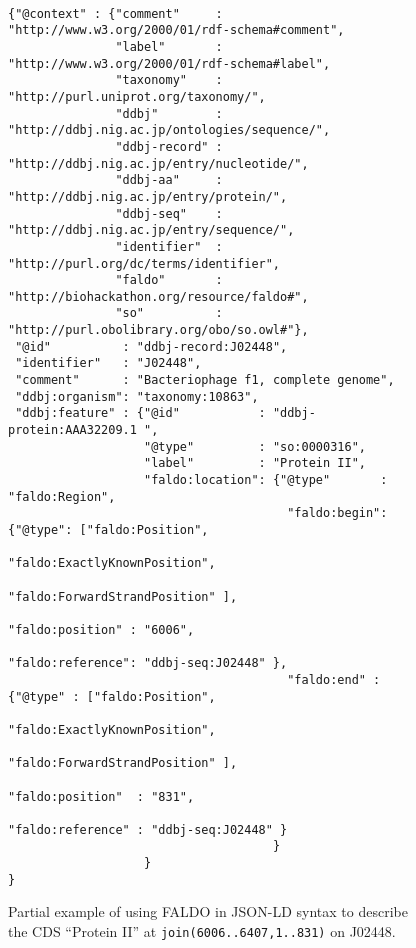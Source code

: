 \begin{figure}
\begin{shaded}
\small
\begin{verbatim}

{"@context" : {"comment"     : "http://www.w3.org/2000/01/rdf-schema#comment",
               "label"       : "http://www.w3.org/2000/01/rdf-schema#label",
               "taxonomy"    : "http://purl.uniprot.org/taxonomy/",
               "ddbj"        : "http://ddbj.nig.ac.jp/ontologies/sequence/",
               "ddbj-record" : "http://ddbj.nig.ac.jp/entry/nucleotide/",
               "ddbj-aa"     : "http://ddbj.nig.ac.jp/entry/protein/",
               "ddbj-seq"    : "http://ddbj.nig.ac.jp/entry/sequence/",
               "identifier"  : "http://purl.org/dc/terms/identifier",
               "faldo"       : "http://biohackathon.org/resource/faldo#",
               "so"          : "http://purl.obolibrary.org/obo/so.owl#"},
 "@id"          : "ddbj-record:J02448",
 "identifier"   : "J02448",
 "comment"      : "Bacteriophage f1, complete genome",
 "ddbj:organism": "taxonomy:10863",
 "ddbj:feature" : {"@id"           : "ddbj-protein:AAA32209.1 ",
                   "@type"         : "so:0000316",
                   "label"         : "Protein II",
                   "faldo:location": {"@type"       : "faldo:Region",
                                       "faldo:begin": {"@type": ["faldo:Position", 
                                                                 "faldo:ExactlyKnownPosition",
                                                                 "faldo:ForwardStrandPosition" ],
                                                       "faldo:position" : "6006",
                                                       "faldo:reference": "ddbj-seq:J02448" },
                                       "faldo:end" : {"@type" : ["faldo:Position", 
                                                                 "faldo:ExactlyKnownPosition",
                                                                 "faldo:ForwardStrandPosition" ],
                                                      "faldo:position"  : "831",
                                                      "faldo:reference" : "ddbj-seq:J02448" }
                                     }
                   }
}
\end{verbatim}
\end{shaded}
\caption{Partial example of using FALDO in JSON-LD\cite{JSONLDFormatSpec} syntax to describe
the CDS ``Protein II'' at \texttt{join(6006..6407,1..831)} on J02448.}
\label{fig:insdcReverseOverOrigin}
\end{figure}


